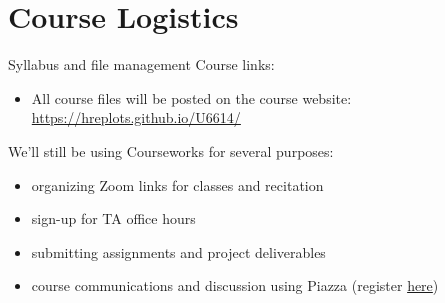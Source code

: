 \documentclass[
  8pt,
  ignorenonframetext,
  dvipsnames]{beamer}
\providecommand{\tightlist}{%
  \setlength{\itemsep}{0pt}\setlength{\parskip}{0pt}}
\let\olditem\item
\renewcommand{\item}{%
  \olditem\vspace{4pt}
}
\begin{document}
\hypertarget{course-logistics}{%
\section{Course Logistics}\label{course-logistics}}

\begin{frame}{Syllabus and file management}
\protect\hypertarget{syllabus-and-file-management}{}
Course links:

\begin{itemize}
\tightlist
\item
  All course files will be posted on the course website:
  \url{https://hreplots.github.io/U6614/}
\end{itemize}

\medskip

We'll still be using Courseworks for several purposes:

\begin{itemize}
\tightlist
\item
  organizing Zoom links for classes and recitation
\item
  sign-up for TA office hours
\item
  submitting assignments and project deliverables
\item
  course communications and discussion using Piazza (register
  \href{https://piazza.com/demo_login?nid=keiqq7y84rt5y2\&auth=6c81e06}{here})
\end{itemize}

\medskip
\end{frame}
\end{document}
